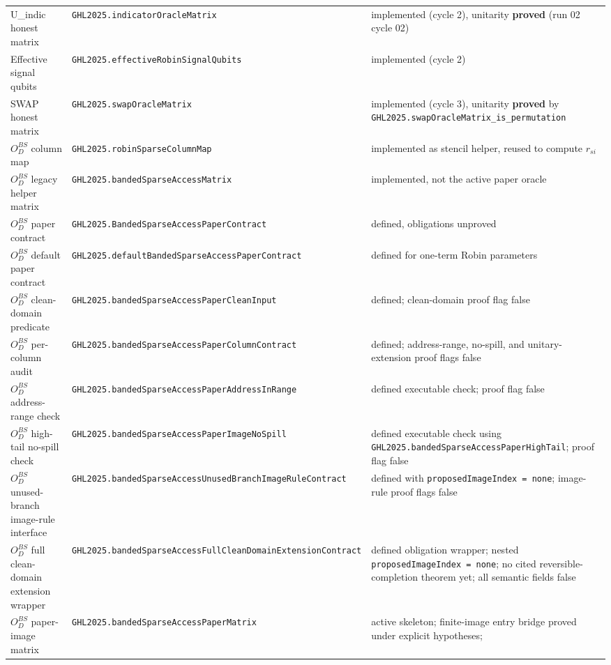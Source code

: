 \begin{center}
\begin{tabular}{lll}
U\_indic honest matrix &
\texttt{GHL2025.indicatorOracleMatrix} &
implemented (cycle 2), unitarity \textbf{proved} (run 02 cycle 02) \\
Effective signal qubits &
\texttt{GHL2025.effectiveRobinSignalQubits} &
implemented (cycle 2) \\
SWAP honest matrix &
\texttt{GHL2025.swapOracleMatrix} &
implemented (cycle 3), unitarity \textbf{proved} by
\texttt{GHL2025.swapOracleMatrix\_is\_permutation} \\
$O_D^{BS}$ column map &
\texttt{GHL2025.robinSparseColumnMap} &
implemented as stencil helper, reused to compute $r_{si}$ \\
$O_D^{BS}$ legacy helper matrix &
\texttt{GHL2025.bandedSparseAccessMatrix} &
implemented, not the active paper oracle \\
$O_D^{BS}$ paper contract &
\texttt{GHL2025.BandedSparseAccessPaperContract} &
defined, obligations unproved \\
$O_D^{BS}$ default paper contract &
\texttt{GHL2025.defaultBandedSparseAccessPaperContract} &
defined for one-term Robin parameters \\
$O_D^{BS}$ clean-domain predicate &
\texttt{GHL2025.bandedSparseAccessPaperCleanInput} &
defined; clean-domain proof flag false \\
$O_D^{BS}$ per-column audit &
\texttt{GHL2025.bandedSparseAccessPaperColumnContract} &
defined; address-range, no-spill, and unitary-extension proof flags false \\
$O_D^{BS}$ address-range check &
\texttt{GHL2025.bandedSparseAccessPaperAddressInRange} &
defined executable check; proof flag false \\
$O_D^{BS}$ high-tail no-spill check &
\texttt{GHL2025.bandedSparseAccessPaperImageNoSpill} &
defined executable check using \texttt{GHL2025.bandedSparseAccessPaperHighTail};
proof flag false \\
$O_D^{BS}$ unused-branch image-rule interface &
\texttt{GHL2025.bandedSparseAccessUnusedBranchImageRuleContract} &
defined with \texttt{proposedImageIndex = none}; image-rule proof flags false \\
$O_D^{BS}$ full clean-domain extension wrapper &
\texttt{GHL2025.bandedSparseAccessFullCleanDomainExtensionContract} &
defined obligation wrapper; nested \texttt{proposedImageIndex = none}; no
cited reversible-completion theorem yet; all semantic fields false \\
$O_D^{BS}$ paper-image matrix &
\texttt{GHL2025.bandedSparseAccessPaperMatrix} &
active skeleton; finite-image entry bridge proved under explicit hypotheses;

\end{tabular}
\end{center}
